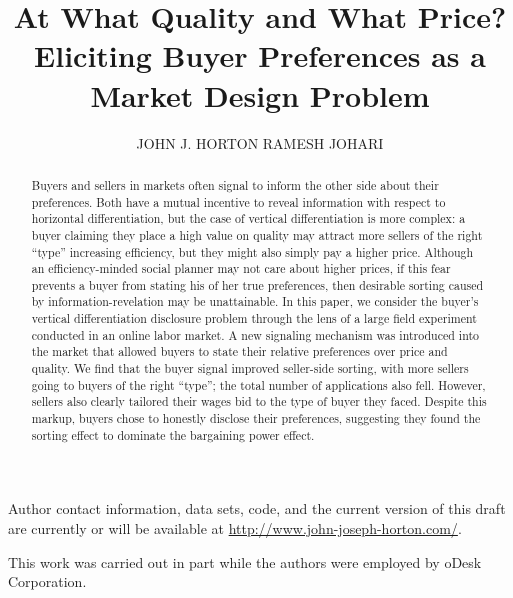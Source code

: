 \documentclass[prodmode]{acmsmall-ec15}
\begin{document}

\title{At What Quality and What Price? Eliciting Buyer Preferences as a Market Design Problem}
\author{JOHN J. HORTON
RAMESH JOHARI
}

\begin{abstract}
  \noindent  Buyers and sellers in markets often signal to inform the other side about their preferences.
  Both have a mutual incentive to reveal information with respect to horizontal differentiation, but the case of vertical differentiation is more complex:
  a buyer claiming they place a high value on quality may attract more sellers of the right ``type'' increasing efficiency, but they might also simply pay a higher price.
  Although an efficiency-minded social planner may not care about higher prices, if this fear prevents a buyer from stating his of her true preferences, then desirable sorting caused by information-revelation may be unattainable.
  In this paper, we consider the buyer's vertical differentiation disclosure problem through the lens of a large field experiment conducted in an online labor market. 
  A new signaling mechanism was introduced into the market that allowed buyers to state their relative preferences over price and quality.
  We find that the buyer signal improved seller-side sorting, with more sellers going to buyers of the right ``type''; the total number of applications also fell.
  However, sellers also clearly tailored their wages bid to the type of buyer they faced.
  Despite this markup, buyers chose to honestly disclose their preferences, suggesting they found the sorting effect to dominate the bargaining power effect.
\end{abstract} 




\begin{bottomstuff}
Author contact information, data sets, code, and the current version of this draft are currently or will be available at \href{http://www.john-joseph-horton.com/}{http://www.john-joseph-horton.com/}.

This work was carried out in part while the authors were employed by oDesk Corporation.
\end{bottomstuff}
\end{document}
